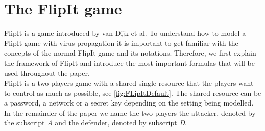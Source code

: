 

%
%
\section{The FlipIt game}
\label{cha1:FlipItGame}
FlipIt is a game introduced by van Dijk et al. To understand how to model a FlipIt game with virus propagation it is important to get familiar with the concepts of the normal FlipIt game and its notations.  Therefore, we first explain the framework of FlipIt and introduce the most important formulas that will be used throughout the paper. \\

FlipIt is a two-players game with a shared single resource that the players want to control as much as possible, see \ref{fig:FLipItDefault}. The shared resource can be a password, a network or a secret key depending on the setting being modelled. In the remainder of the paper we name the two players the attacker, denoted by the subscript \textit{A} and the defender, denoted by subscript \textit{D}. 

